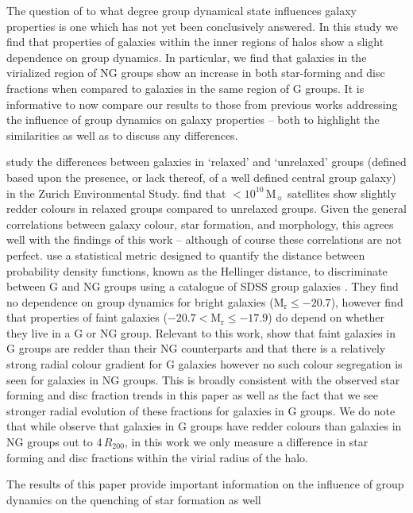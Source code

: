 \documentclass[a4paper,fleqn,usenatbib]{mnras}
\newcommand{\Msun}{\,\mathrm{M_{\sun}}}
\begin{document}
The question of to what degree group dynamical state influences galaxy
properties is one which has not yet been conclusively answered.  In
this study we find that properties of galaxies within the inner
regions of halos show a slight dependence on group dynamics.  In
particular, we find that galaxies in the virialized region of NG
groups show an increase in both star-forming and disc fractions
when compared to galaxies in the same region of G groups.  It is
informative to now compare our results to those from previous 
works addressing the influence of group dynamics on galaxy properties
-- both to highlight the similarities as well as to discuss any
differences.
\par
\citet{carollo2013} study the differences between galaxies in
`relaxed' and `unrelaxed' groups (defined based upon the presence, or
lack thereof, of a well defined central group galaxy) in the Zurich
Environmental Study.  \citet{carollo2013} find that $<10^{10}\Msun$
satellites show slightly redder colours in relaxed groups compared to
unrelaxed groups.  Given the general correlations between galaxy colour, star
formation, and morphology, this agrees well with the findings of this
work -- although of course these correlations are not perfect.
\citet{ribeiro2013} use a statistical metric designed to quantify the
distance between probability density functions, known as the Hellinger
distance, to discriminate between G and NG groups using a
catalogue of SDSS group galaxies
\citep{berlind2006}.  They find no dependence on group dynamics for
bright galaxies ($\mathrm{M_r} \le -20.7$), however find that
properties of faint galaxies ($-20.7 < \mathrm{M_r} \le -17.9$) do
depend on whether they live in a G or NG group.  Relevant to this
work, \citet{ribeiro2013} show that faint galaxies in G groups are
redder than their NG counterparts and that there is a relatively
strong radial colour gradient for G galaxies however no such colour
segregation is seen for galaxies in NG groups.  This is broadly
consistent with the observed star forming and disc fraction trends in
this paper as well as the fact that we see stronger radial evolution
of these fractions for galaxies in G groups.  We do note that while
\citet{ribeiro2010} observe that galaxies in G groups have redder
colours than galaxies in NG groups out to $4\,R_{200}$, in this work
we only measure a difference in star forming and disc fractions within
the virial radius of the halo.
\par
The results of this paper provide important information on the
influence of group dynamics on the quenching of star formation as well
\end{document}
